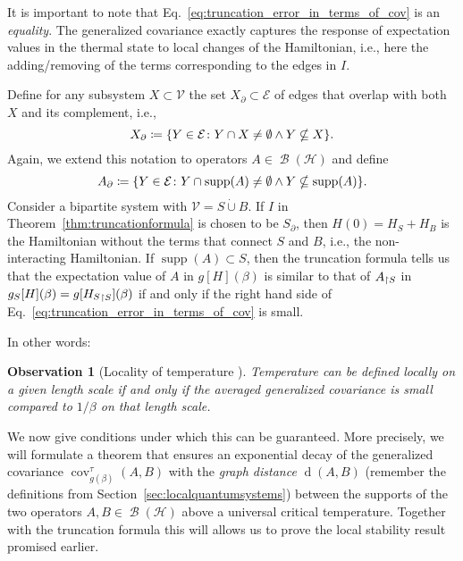 \documentclass[a4paper,12pt,listof=totoc,index=totoc,bibliography=totoc,headsepline=false,headings=normal,BCOR16.153846mm,DIV12,headinclude,twoside,cleardoublepage=empty,numbers=noenddot,final]{scrreprt}
\theoremstyle{mystyle}
\numberwithin{equation}{section}
\numberwithin{figure}{section}
\numberwithin{lemma}{section}
\numberwithin{theorem}{section}
\numberwithin{corollary}{section}
\numberwithin{definition}{section}
\numberwithin{conjecture}{section}
\newtheorem{observation}{Observation}
\numberwithin{observation}{section}
\newcommand{\+}{\mkern2mu}
\newcommand{\coloneqq}{\mathrel{\vcentcolon\mkern-1.2mu=}} %
\newcommand{\dunion}{\mathbin{\dot{\cup}}}
\newcommand{\texteqref}[1]{Eq.~\eqref{#1}}
\newcommand{\oftype}{\colon}
\renewcommand{\H}{H}
\newcommand{\rhog}{g}
\newcommand{\Vset}{\mathcal{V}}
\newcommand{\Eset}{\mathcal{E}}
\newcommand{\trunc}[2]{{#1}_{\upharpoonright \mathnormal{#2}}}
\DeclareMathOperator{\1}{\mathds{1}}
\DeclareMathOperator{\Bop}{\mathcal{B}}
\DeclareMathOperator{\supp}{supp}
\DeclareMathOperator{\cov}{cov}
\DeclareMathOperator{\dist}{d}
\newcommand{\mc}[1]{\mathcal{#1}}
\newcommand{\mcH}{\mc{H}}
\begin{document}
It is important to note that \texteqref{eq:truncation_error_in_terms_of_cov} is an \emph{equality}.
The generalized covariance exactly captures the response of expectation values in the thermal state to local changes of the Hamiltonian, i.e., here the adding/removing of the terms corresponding to the edges in $I$.

Define for any subsystem $X \subset \Vset$ the set $X_\partial \subset \Eset$ of edges that overlap with both $X$ and its complement, i.e.,
\begin{equation}
  X_\partial \coloneqq \{ Y \in \Eset\oftype Y \cap X \neq \emptyset \land Y \nsubseteq X \} .
\end{equation}
Again, we extend this notation to operators $A \in \Bop(\mcH)$ and define
\begin{equation}
  A_\partial \coloneqq \{ Y \in \Eset\oftype Y \cap \supp(A) \neq \emptyset \land Y \nsubseteq \supp(A) \} .
\end{equation}
Consider a bipartite system with $\Vset = S \dunion B$.
If $I$ in Theorem~\ref{thm:truncationformula} is chosen to be $S_\partial$, then $\H(0) = \H_S + \H_B$ is the Hamiltonian without the terms that connect $S$ and $B$, i.e., the non-interacting Hamiltonian.
If $\supp(A) \subset S$, then the truncation formula tells us that the expectation value of $A$ in $\rhog[\H](\beta)$ is similar to that of $\trunc A S$ in $\rhog_S[\H](\beta) = \rhog[\trunc{\H_S} S](\beta)$ if and only if the right hand side of \texteqref{eq:truncation_error_in_terms_of_cov} is small.

In other words:
\begin{observation}[Locality of temperature \cite{Kliesch2013a}] 
  Temperature can be defined locally on a given length scale if and only if the averaged generalized covariance is small compared to $1/\beta$ on that length scale. 
\end{observation}

We now give conditions under which this can be guaranteed. 
More precisely, we will formulate a theorem that ensures an exponential decay of the generalized covariance $\cov^\tau_{\rhog(\beta)}(A,B)$ with the \emph{graph distance} $\dist(A,B)$ (remember the definitions from Section~\ref{sec:localquantumsystems}) between the supports of the two operators $A,B \in \Bop(\mcH)$ above a universal critical temperature.
Together with the truncation formula this will allows us to prove the local stability result promised earlier.
\end{document}

